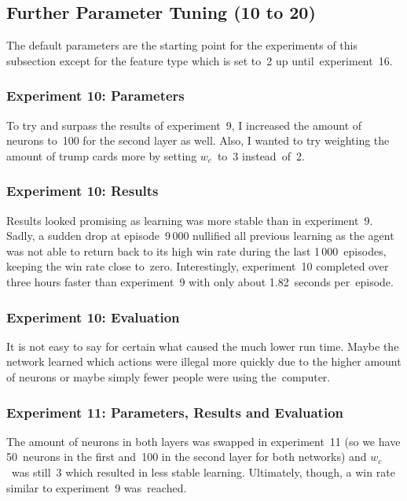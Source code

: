\documentclass[a4paper,titlepage]{article}
\begin{document}
\subsection{Further Parameter Tuning (10 to 20)}

The default parameters are the starting point for the experiments of this subsection except for the feature type which is set to~2 up until~experiment~16.

\subsubsection*{Experiment 10: Parameters}

To try and surpass the results of experiment~9, I increased the amount of neurons to~100 for the second layer as well. Also, I wanted to try weighting the amount of trump cards more by setting $w_c$~to~3 instead~of~2.

\subsubsection*{Experiment 10: Results}

Results looked promising as learning was more stable than in experiment~9. Sadly, a sudden drop at episode~9\,000 nullified all previous learning as the agent was not able to return back to its high win rate during the last 1\,000~episodes, keeping the win rate close to~zero. Interestingly, experiment~10 completed over three hours faster than experiment~9 with only about 1.82~seconds per~episode.

\subsubsection*{Experiment 10: Evaluation}

It is not easy to say for certain what caused the much lower run time. Maybe the network learned which actions were illegal more quickly due to the higher amount of neurons or maybe simply fewer people were using the~computer.

\subsubsection*{Experiment 11: Parameters, Results and Evaluation}

The amount of neurons in both layers was swapped in experiment~11 (so we have 50~neurons in the first and~100 in the second layer for both networks) and $w_c$~was still~3 which resulted in less stable learning. Ultimately, though, a win rate similar to experiment~9 was~reached.
\end{document}
